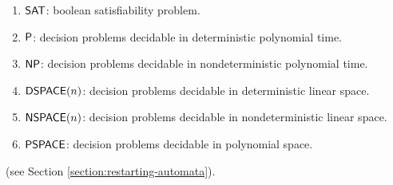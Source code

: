 \begin{enumerate}[]
\item $\textup{\sf SAT}$: boolean satisfiability problem.
\item $\textup{\sf P}$: decision problems decidable in deterministic polynomial time.
\item $\textup{\sf NP}$: decision problems decidable in nondeterministic polynomial time.
\item $\textup{\sf DSPACE}(n)$: decision problems decidable in deterministic linear space.
\item $\textup{\sf NSPACE}(n)$: decision problems decidable in nondeterministic linear space.
\item $\textup{\sf PSPACE}$: decision problems decidable in polynomial space.
\end{enumerate}

 (see Section \ref{section:restarting-automata}).


